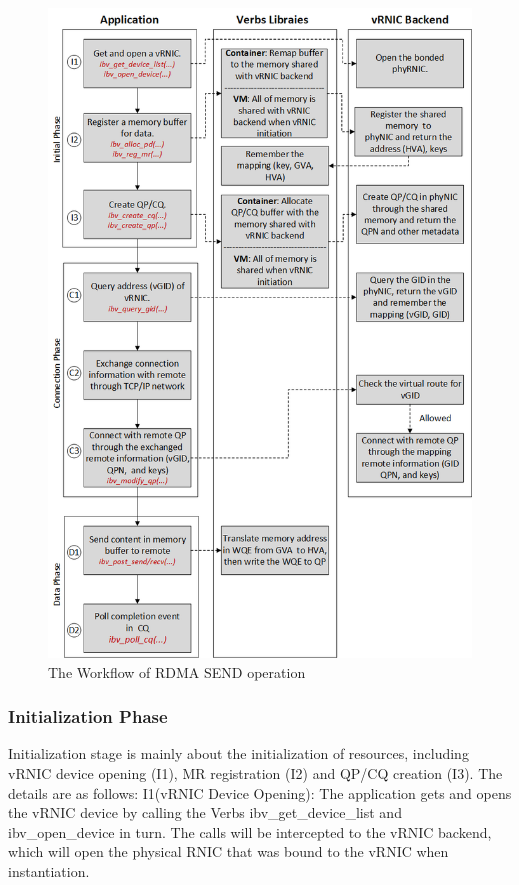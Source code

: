 \begin{figure}[!ht]
	\centering
	\includegraphics[width=1\linewidth]{images/RDMA-path.png}
	\caption{The Workflow of RDMA SEND operation}
	\label{fig:route-config}
\end{figure}

\subsubsection{Initialization Phase}
Initialization stage is mainly about the initialization of resources, including vRNIC device opening (I1), MR registration (I2) and QP/CQ creation (I3). The details are as follows:
I1(vRNIC Device Opening): The application gets and opens the vRNIC device by calling the Verbs ibv\_get\_device\_list and ibv\_open\_device in turn. The calls will be intercepted to the vRNIC backend, which will open the physical RNIC that was bound to the vRNIC when instantiation.

